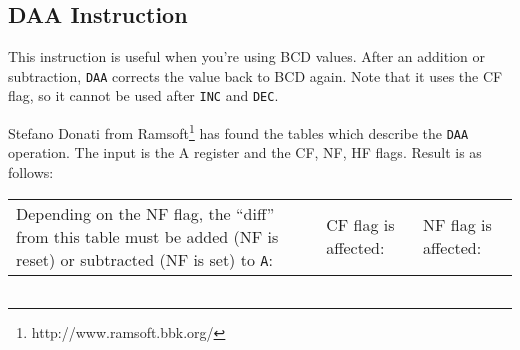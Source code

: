 \subsection{DAA Instruction}
\label{daa}

This instruction is useful when you're using BCD values. After an addition or subtraction, {\tt DAA} corrects the value back to BCD again.  Note that it uses the CF flag, so it cannot be used after {\tt INC} and {\tt DEC}.

Stefano Donati from Ramsoft\footnote{http://www.ramsoft.bbk.org/} has found the tables which describe the {\tt DAA} operation. The input is the A register and the CF, NF, HF flags. Result is as follows:

{
    \footnotesize

    \begin{tabular}{b{5.8cm}b{4.8cm}b{4.8cm}}
        Depending on the NF flag, the ``diff'' from this table must be added (NF is reset) or subtracted (NF is set) to {\tt A}:
        &
        CF flag is affected:
        &
        NF flag is affected: \\
    \end{tabular}

    \begin{tabular}{p{5.8cm}p{4.8cm}p{4.8cm}}


\end{tabular}}
